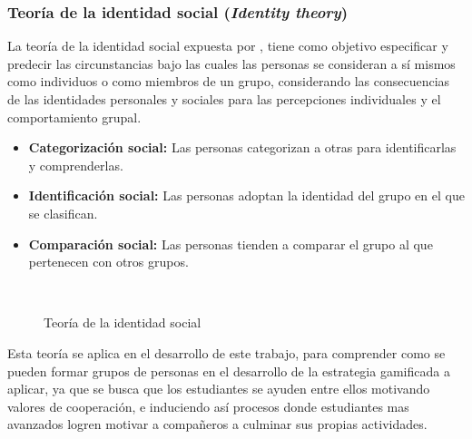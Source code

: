 \subsubsection{Teoría de la identidad social (\textit{Identity theory})}

La teoría de la identidad social expuesta por , tiene como objetivo especificar y
predecir las circunstancias bajo las cuales las personas se consideran a sí mismos como individuos o como 
miembros de un grupo, considerando las consecuencias de las identidades personales y sociales para las 
percepciones individuales y el comportamiento grupal.

\begin{itemize}
\item \textbf{Categorización social:} Las personas categorizan a otras para identificarlas y comprenderlas.
\item \textbf{Identificación social:} Las personas adoptan la identidad del grupo en el que se clasifican.
\item \textbf{Comparación social:} Las personas tienden a comparar el grupo al que pertenecen con otros
grupos.
\end{itemize}

\begin{figure}[ht]
\caption{Teoría de la identidad social}
\label{img:TIS}
\centering
{}
\\
{\footnotesize \citeA<basada en>{tajfel1979integrative}}
\end{figure}

Esta teoría se aplica en el desarrollo de este trabajo, para comprender como se pueden formar grupos de 
personas en el desarrollo de la estrategia gamificada a aplicar, ya que se busca que los estudiantes se ayuden
entre ellos motivando valores de cooperación, e induciendo así procesos donde estudiantes mas avanzados logren 
motivar a compañeros a culminar sus propias actividades.


